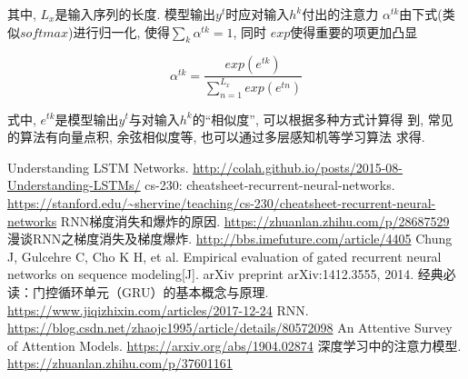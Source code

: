 \documentclass[UTF8, twocolumn]{ctexart}
\begin{document}
其中, $L_x$是输入序列的长度. 模型输出$y^t$时应对输入$h^k$付出的注意力
$\alpha^{tk}$由下式(类似$softmax$)进行归一化, 使得$\sum_k \alpha^{tk} = 1$, 同时
$exp$使得重要的项更加凸显

\begin{equation}
\alpha^{tk} = \frac{exp(e^{tk})}{\sum_{n=1}^{L_x} exp(e^{tn})}
\end{equation}

式中, $e^{tk}$是模型输出$y^t$与对输入$h^k$的``相似度'', 可以根据多种方式计算得
到, 常见的算法有向量点积, 余弦相似度等, 也可以通过多层感知机等学习算法
求得\cite{9}.

\begin{thebibliography}{99}
Understanding LSTM Networks. \url{http://colah.github.io/posts/2015-08-Understanding-LSTMs/}
cs-230: cheatsheet-recurrent-neural-networks. \url{https://stanford.edu/~shervine/teaching/cs-230/cheatsheet-recurrent-neural-networks}
RNN梯度消失和爆炸的原因. \url{https://zhuanlan.zhihu.com/p/28687529}
漫谈RNN之梯度消失及梯度爆炸. \url{http://bbs.imefuture.com/article/4405}
Chung J, Gulcehre C, Cho K H, et al. Empirical evaluation of gated recurrent neural networks on sequence modeling[J]. arXiv preprint arXiv:1412.3555, 2014.
经典必读：门控循环单元（GRU）的基本概念与原理. \url{https://www.jiqizhixin.com/articles/2017-12-24}
RNN. \url{https://blog.csdn.net/zhaojc1995/article/details/80572098}
An Attentive Survey of Attention Models. \url{https://arxiv.org/abs/1904.02874}
深度学习中的注意力模型. \url{https://zhuanlan.zhihu.com/p/37601161}
\end{thebibliography}
\end{document}
